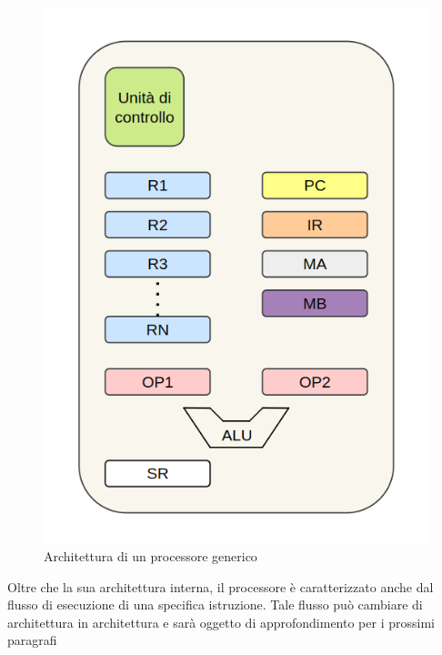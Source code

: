 \begin{figure}
    \centering
    \includegraphics[width=.5\textwidth]{img/processore.png}
    \caption{Architettura di un processore generico}\label{img:processore}
\end{figure}

Oltre che la sua architettura interna, il processore è caratterizzato anche dal flusso di esecuzione di una specifica istruzione. Tale flusso può cambiare di architettura in architettura e sarà oggetto di approfondimento per i prossimi paragrafi